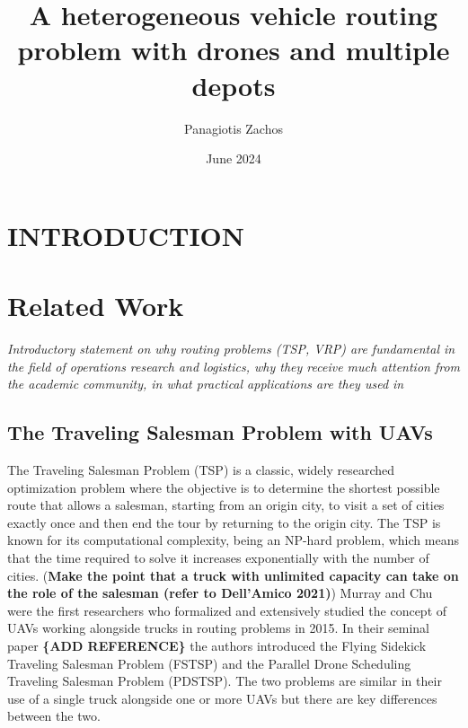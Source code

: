 \documentclass{article}
\title{A heterogeneous vehicle routing problem with drones and multiple depots}
\author{Panagiotis Zachos}
\date{June 2024}
\begin{document}
	\maketitle
	\section{INTRODUCTION}
	
	
	\section{Related Work}
	\textit{Introductory statement on why routing problems (TSP, VRP) are fundamental in the field of operations research and logistics, why they receive much attention from the academic community, in what practical applications are they used in}
	
	\subsection{The Traveling Salesman Problem with UAVs}
	The Traveling Salesman Problem (TSP) is a classic, widely researched optimization problem where the objective is to determine the shortest possible route that allows a salesman, starting from an origin city, to visit a set of cities exactly once and then end the tour by returning to the origin city. The TSP is known for its computational complexity, being an NP-hard problem, which means that the time required to solve it increases exponentially with the number of cities.
	(\textbf{Make the point that a truck with unlimited capacity can take on the role of the salesman (refer to Dell'Amico 2021)}) 
	Murray and Chu were the first researchers who formalized and extensively studied the concept of UAVs working alongside trucks in routing problems in 2015. In their seminal paper \textbf{\{ADD REFERENCE\}} the authors introduced the Flying Sidekick Traveling Salesman Problem (FSTSP) and the Parallel Drone Scheduling Traveling Salesman Problem (PDSTSP). The two problems are similar in their use of a single truck alongside one or more UAVs but there are key differences between the two. 
	
\end{document}
